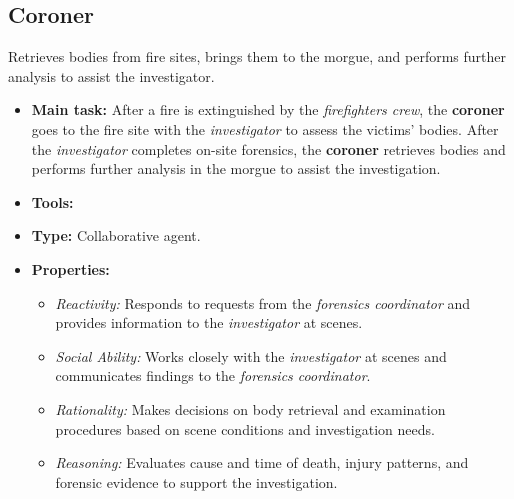 \documentclass{article}
\begin{document}
\subsection*{Coroner}
Retrieves bodies from fire sites, brings them to the morgue, and performs further analysis to assist the investigator.
\begin{itemize}
    \item \textbf{Main task:} After a fire is extinguished by the \textit{firefighters crew}, the \textbf{coroner} goes to the fire site with the \textit{investigator} to assess the victims' bodies. After the \textit{investigator} completes on-site forensics, the \textbf{coroner} retrieves bodies and performs further analysis in the morgue to assist the investigation.
    \item \textbf{Tools:}
    \item \textbf{Type:} Collaborative agent.
    \item \textbf{Properties:}
    \begin{itemize}
        \item \textit{Reactivity:} Responds to requests from the \textit{forensics coordinator} and provides information to the \textit{investigator} at scenes.
        \item \textit{Social Ability:} Works closely with the \textit{investigator} at scenes and communicates findings to the \textit{forensics coordinator}.
        \item \textit{Rationality:} Makes decisions on body retrieval and examination procedures based on scene conditions and investigation needs.
        \item \textit{Reasoning:} Evaluates cause and time of death, injury patterns, and forensic evidence to support the investigation.
    \end{itemize}
\end{itemize}
\end{document}
